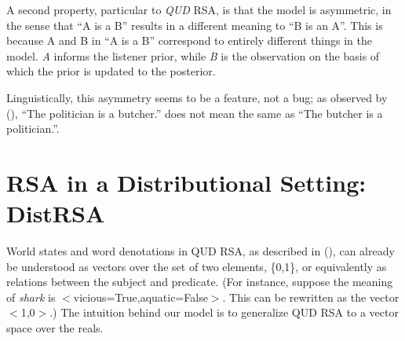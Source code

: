 \documentclass[10pt,letterpaper,twocolumn]{article}
\begin{document}
A second property, particular to \emph{QUD} RSA, is that the model is asymmetric, in the sense that ``A is a B'' results in a different meaning to ``B is an A''. This is because A and B in ``A is a B'' correspond to entirely different things in the model. \emph{A} informs the listener prior, while \emph{B} is the observation on the basis of which the prior is updated to the posterior.

Linguistically, this asymmetry seems to be a feature, not a bug; as observed by (\cite{way1991knowledge}), ``The politician is a butcher.'' does not mean the same as ``The butcher is a politician.''.







\section{RSA in a Distributional Setting: DistRSA}

World states and word denotations in QUD RSA, as described in (\cite{kao}), can already be understood as vectors over the set of two elements, \{0,1\}, or equivalently as relations between the subject and predicate. (For instance, suppose the meaning of \emph{shark} is $<$vicious=True,aquatic=False$>$. This can be rewritten as the vector $<$1,0$>$.) The intuition behind our model is to generalize QUD RSA to a vector space over the reals.
\end{document}
